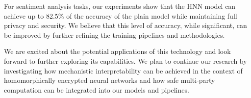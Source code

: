 \documentclass{article}
\begin{document}
For sentiment analysis tasks, our experiments show that the HNN model can achieve up to 82.5\% of the accuracy of the plain model while maintaining full privacy and security. We believe that this level of accuracy, while significant, can be improved by further refining the training pipelines and methodologies.

We are excited about the potential applications of this technology and look forward to further exploring its capabilities. We plan to continue our research by investigating how mechanistic interpretability can be achieved in the context of homomorphically encrypted neural networks and how safe multi-party computation can be integrated into our models and pipelines.


 

\end{document}
